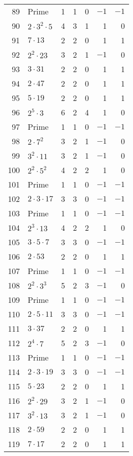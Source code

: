 \documentclass[12pt]{article}
\begin{document}
\begin{tabular}{|r|l|r|r|r|r|r|}
89 & Prime & 1 & 1 & 0 & $-1$ & $-1$ \\
90 & $2 \cdot 3^2 \cdot 5$ & 4 & 3 & 1 & 1 & 0 \\
91 & $7 \cdot 13$ & 2 & 2 & 0 & 1 & 1 \\
92 & $2^2 \cdot 23$ & 3 & 2 & 1 & $-1$ & 0 \\
93 & $3 \cdot 31$ & 2 & 2 & 0 & 1 & 1 \\
94 & $2 \cdot 47$ & 2 & 2 & 0 & 1 & 1 \\
95 & $5 \cdot 19$ & 2 & 2 & 0 & 1 & 1 \\
96 & $2^5 \cdot 3$ & 6 & 2 & 4 & 1 & 0 \\
97 & Prime & 1 & 1 & 0 & $-1$ & $-1$ \\
98 & $2 \cdot 7^2$ & 3 & 2 & 1 & $-1$ & 0 \\
99 & $3^2 \cdot 11$ & 3 & 2 & 1 & $-1$ & 0 \\
100 & $2^2 \cdot 5^2$ & 4 & 2 & 2 & 1 & 0 \\
101 & Prime & 1 & 1 & 0 & $-1$ & $-1$ \\
102 & $2 \cdot 3 \cdot 17$ & 3 & 3 & 0 & $-1$ & $-1$ \\
103 & Prime & 1 & 1 & 0 & $-1$ & $-1$ \\
104 & $2^3 \cdot 13$ & 4 & 2 & 2 & 1 & 0 \\
105 & $3 \cdot 5 \cdot 7$ & 3 & 3 & 0 & $-1$ & $-1$ \\
106 & $2 \cdot 53$ & 2 & 2 & 0 & 1 & 1 \\
107 & Prime & 1 & 1 & 0 & $-1$ & $-1$ \\
108 & $2^2 \cdot 3^3$ & 5 & 2 & 3 & $-1$ & 0 \\
109 & Prime & 1 & 1 & 0 & $-1$ & $-1$ \\
110 & $2 \cdot 5 \cdot 11$ & 3 & 3 & 0 & $-1$ & $-1$ \\
111 & $3 \cdot 37$ & 2 & 2 & 0 & 1 & 1 \\
112 & $2^4 \cdot 7$ & 5 & 2 & 3 & $-1$ & 0 \\
113 & Prime & 1 & 1 & 0 & $-1$ & $-1$ \\
114 & $2 \cdot 3 \cdot 19$ & 3 & 3 & 0 & $-1$ & $-1$ \\
115 & $5 \cdot 23$ & 2 & 2 & 0 & 1 & 1 \\
116 & $2^2 \cdot 29$ & 3 & 2 & 1 & $-1$ & 0 \\
117 & $3^2 \cdot 13$ & 3 & 2 & 1 & $-1$ & 0 \\
118 & $2 \cdot 59$ & 2 & 2 & 0 & 1 & 1 \\
119 & $7 \cdot 17$ & 2 & 2 & 0 & 1 & 1 \\

\end{tabular}
\end{document}

